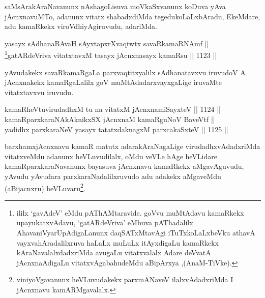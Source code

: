\begin{artha}
saMsArakAraNavanunx nAshagoLisuva moVkaSxvanunx koDuva yAva jAcnxnavuMTo, adanunx vitatx shabadxdiMda tegedukoLaLxbAradu, EkeMdare, adu kamaRkekx viroVdhiyAgiruvudu, adariMda.
\end{artha}


\begin{shl}
yasayx sAdhanaBAvaH sAyxtapxrXvaqtwtx savaRkamaRNAmf || \\
\footnote{ililx `gavAdeV' eMdu pAThAMtaravide. goVvu muMtAdavu kamaRkekx upayukatxvAdavu, `gatARdeVriva' eMbuva pAThadalilx AhavaniVyarUpAdigaLanunx daqSATxMtavAgi iTuTxkoLaLxbeVku athavA vayxvahAradalilxruva haLaLx muLuLx itAyxdigaLu kamaRkekx kAraNavalalxdadxriMda avugaLu vitatxvalalx Adare deVvatA jAcnxnaAdigaLu vitatxvAgabahudeMdu aBipArxya ,(AnaM-TiVke).}gatARdeVriva vitatxtavxM tasayx jAcnxnasayx kamaRsu \hfill || 1123 ||  
\end{shl}


\begin{artha}
yAvudakekx savaRkamaRgaLa parxvaqtitxyalilx sAdhanatavxvu iruvudoV A jAcnxnakekx kamaRgaLalilx goV muMtAdadarxvayxgaLige iruvaMte vitatxtavxvu iruvudu.
\end{artha}


\begin{shl}
kamaRheVtuvirudadhxM tu na vitatxM jAcnxnamiSayxteV \hfill || 1124 ||  \\
kamaRparxkaraNAkAknikxSX jAcnxnaM kamaRguNoV BaveVtf || \\
yadidhx parxkaraNeV yasayx tatatxdaknagxM parxcakaSxteV \hfill || 1125 || 
\end{shl}

\begin{artha}
barxhamxjAcnxnavu kamaR matutx adarakAraNagaLige virudadhxvAdadxriMda vitatxveMdu adanunx heVLuvudilalx, oMdu veVLe hAge heVLidare kamaRparxkaraNavanunx bayasuva jAcnxnavu kamaRkekx aMgavAguvudu, yAvudu yAvudara parxkaraNadalilxruvudo adu adakekx aMgaveMdu (aBijacnxru) heVLuvaru\footnote{viniyoVgavanunx heVLuvudakekx parxmANaveV ilalxvAdadxriMda I jAcnxnavu kamARMgavalalx.}.
\end{artha}


